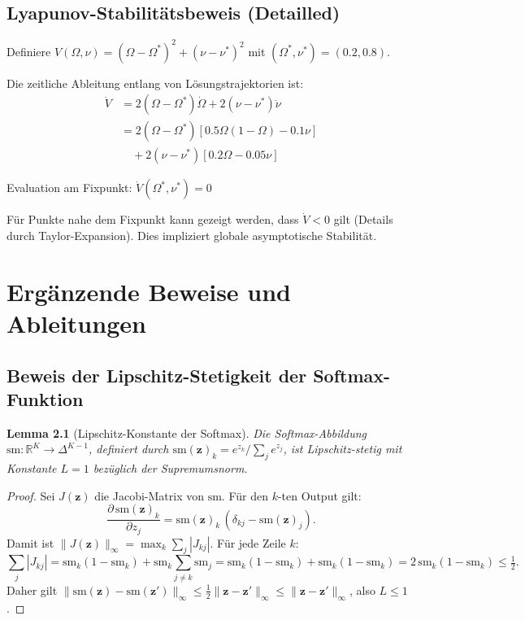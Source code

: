 \documentclass[a4paper, 12pt, twoside, openright]{report}
\newtheorem{lemma}[theorem]{Lemma}
\theoremstyle{definition}
\theoremstyle{definition}
\begin{document}
\section{Lyapunov-Stabilitätsbeweis (Detailled)}

Definiere $V(\Omega, \nu) = (\Omega - \Omega^*)^2 + (\nu - \nu^*)^2$ mit $(\Omega^*, \nu^*) = (0.2, 0.8)$.

Die zeitliche Ableitung entlang von Lösungstrajektorien ist:
\begin{align}
    \dot{V} &= 2(\Omega - \Omega^*)\dot{\Omega} + 2(\nu - \nu^*)\dot{\nu} \\
    &= 2(\Omega - \Omega^*)[0.5\Omega(1-\Omega) - 0.1\nu] \\
    &\quad + 2(\nu - \nu^*)[0.2\Omega - 0.05\nu]
\end{align}

Evaluation am Fixpunkt: $\dot{V}(\Omega^*, \nu^*) = 0$

Für Punkte nahe dem Fixpunkt kann gezeigt werden, dass $\dot{V} < 0$ gilt (Details durch Taylor-Expansion). Dies impliziert globale asymptotische Stabilität.

\chapter{Ergänzende Beweise und Ableitungen}

\section{Beweis der Lipschitz-Stetigkeit der Softmax-Funktion}

\begin{lemma}[Lipschitz-Konstante der Softmax]
	Die Softmax-Abbildung $\mathrm{sm} : \mathbb{R}^K \to \Delta^{K-1}$,
	definiert durch $\mathrm{sm}(\mathbf{z})_k = e^{z_k} / \sum_j e^{z_j}$,
	ist Lipschitz-stetig mit Konstante $L = 1$ bezüglich der Supremumsnorm.
\end{lemma}

\begin{proof}
	Sei $J(\mathbf{z})$ die Jacobi-Matrix von $\mathrm{sm}$. Für den
	$k$-ten Output gilt:
	\[
	\frac{\partial \,\mathrm{sm}(\mathbf{z})_k}{\partial z_j} =
	\mathrm{sm}(\mathbf{z})_k\,(\delta_{kj} - \mathrm{sm}(\mathbf{z})_j).
	\]
	Damit ist $\|J(\mathbf{z})\|_\infty = \max_k \sum_j |J_{kj}|$.
	Für jede Zeile $k$:
	\[
	\sum_j |J_{kj}| = \mathrm{sm}_k(1 - \mathrm{sm}_k) +
	\mathrm{sm}_k\sum_{j \neq k} \mathrm{sm}_j
	= \mathrm{sm}_k(1 - \mathrm{sm}_k) + \mathrm{sm}_k(1 - \mathrm{sm}_k)
	= 2\,\mathrm{sm}_k(1-\mathrm{sm}_k) \leq \tfrac{1}{2}.
	\]
	Daher gilt $\|\mathrm{sm}(\mathbf{z}) - \mathrm{sm}(\mathbf{z}')\|_\infty
	\leq \tfrac{1}{2}\|\mathbf{z} - \mathbf{z}'\|_\infty \leq
	\|\mathbf{z} - \mathbf{z}'\|_\infty$, also $L \leq 1$.
\end{proof}
\end{document}
